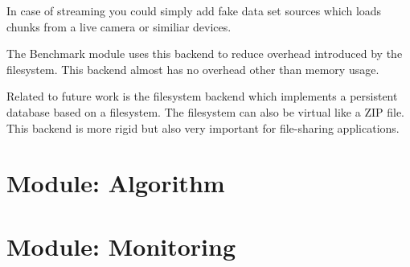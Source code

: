 In case of streaming you could simply add fake data set sources which loads chunks from a live camera or similiar devices.

The Benchmark module uses this backend to reduce overhead introduced by the filesystem. This backend almost has no overhead other than memory usage.

Related to future work is the filesystem backend which implements a persistent database based on a filesystem. The filesystem can also be virtual like a ZIP file. This backend is more rigid but also very important for file-sharing applications.

\section{Module: Algorithm}
\label{sec:algorithm}

\section{Module: Monitoring}
\label{sec:monitoring}

